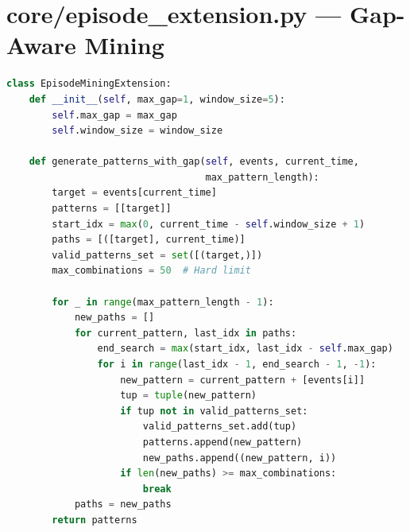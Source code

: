 \documentclass[a4paper,12pt]{report}
\begin{document}
\section{core/episode\_extension.py --- Gap-Aware Mining}
\begin{lstlisting}[language=Python, caption={Gap-Aware Episode Mining}]
class EpisodeMiningExtension:
    def __init__(self, max_gap=1, window_size=5):
        self.max_gap = max_gap
        self.window_size = window_size

    def generate_patterns_with_gap(self, events, current_time,
                                   max_pattern_length):
        target = events[current_time]
        patterns = [[target]]
        start_idx = max(0, current_time - self.window_size + 1)
        paths = [([target], current_time)]
        valid_patterns_set = set([(target,)])
        max_combinations = 50  # Hard limit

        for _ in range(max_pattern_length - 1):
            new_paths = []
            for current_pattern, last_idx in paths:
                end_search = max(start_idx, last_idx - self.max_gap)
                for i in range(last_idx - 1, end_search - 1, -1):
                    new_pattern = current_pattern + [events[i]]
                    tup = tuple(new_pattern)
                    if tup not in valid_patterns_set:
                        valid_patterns_set.add(tup)
                        patterns.append(new_pattern)
                        new_paths.append((new_pattern, i))
                    if len(new_paths) >= max_combinations:
                        break
            paths = new_paths
        return patterns
\end{lstlisting}
\end{document}
